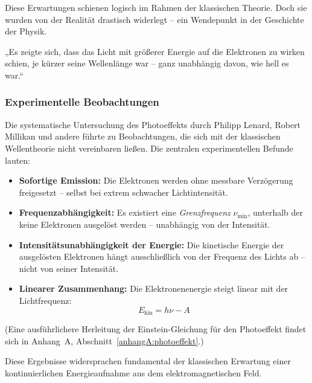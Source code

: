 Diese Erwartungen schienen logisch im Rahmen der klassischen Theorie. Doch sie wurden von der Realität drastisch widerlegt – ein Wendepunkt in der Geschichte der Physik.

\vspace{1em}
\begin{tcolorbox}[physikbox, title=Philipp Lenard (1902)\textit{ \cite{lenard1902} }]
	\label{box:Philipp Lenhard}
	\small
	„Es zeigte sich, dass das Licht mit größerer Energie auf die Elektronen zu wirken schien,
	je kürzer seine Wellenlänge war – ganz unabhängig davon, wie hell es war.“
\end{tcolorbox}

\subsubsection{Experimentelle Beobachtungen}

Die systematische Untersuchung des Photoeffekts durch Philipp Lenard, Robert Millikan und andere führte zu Beobachtungen, die sich mit der klassischen Wellentheorie nicht vereinbaren ließen. Die zentralen experimentellen Befunde lauten:

\begin{itemize}
	\item \textbf{Sofortige Emission:} Die Elektronen werden ohne messbare Verzögerung freigesetzt – selbst bei extrem schwacher Lichtintensität.
	\item \textbf{Frequenzabhängigkeit:} Es existiert eine \emph{Grenzfrequenz} \( \nu_{\text{min}} \), unterhalb der keine Elektronen ausgelöst werden – unabhängig von der Intensität.
	\item \textbf{Intensitätsunabhängigkeit der Energie:} Die kinetische Energie der ausgelösten Elektronen hängt ausschließlich von der Frequenz des Lichts ab – nicht von seiner Intensität.
	\item \textbf{Linearer Zusammenhang:} Die Elektronenenergie steigt linear mit der Lichtfrequenz:
	\[
	E_{\text{kin}} = h \nu - A
	\]
\end{itemize}
(Eine ausführlichere Herleitung der Einstein-Gleichung für den Photoeffekt findet sich in Anhang~A, Abschnitt~\ref{anhangA:photoeffekt}.)

Diese Ergebnisse widersprachen fundamental der klassischen Erwartung einer kontinuierlichen Energieaufnahme aus dem elektromagnetischen Feld.

